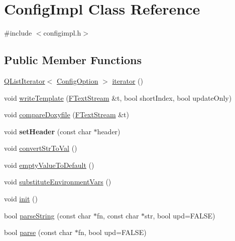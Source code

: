 \hypertarget{class_config_impl}{}\section{Config\+Impl Class Reference}
\label{class_config_impl}


{\ttfamily \#include $<$configimpl.\+h$>$}

\subsection*{Public Member Functions}
\begin{DoxyCompactItemize}
\item 
\mbox{\hyperlink{class_q_list_iterator}{Q\+List\+Iterator}}$<$ \mbox{\hyperlink{class_config_option}{Config\+Option}} $>$ \mbox{\hyperlink{class_config_impl_a71338cf913b7d77ffc139574d7fcfd96}{iterator}} ()
\item 
void \mbox{\hyperlink{class_config_impl_a7c5c68e28946cdb2a25bc9dca561a4c8}{write\+Template}} (\mbox{\hyperlink{class_f_text_stream}{F\+Text\+Stream}} \&t, bool short\+Index, bool update\+Only)
\item 
void \mbox{\hyperlink{class_config_impl_a9e53b42cb637d14b5d072b1e6bb6c9b8}{compare\+Doxyfile}} (\mbox{\hyperlink{class_f_text_stream}{F\+Text\+Stream}} \&t)
\item 
\mbox{\label{class_config_impl_a5a85a09dc81100da9de0dcb148e63c65}} 
void {\bfseries set\+Header} (const char $\ast$header)
\item 
void \mbox{\hyperlink{class_config_impl_a866e373ff4207d492e15ca578e53a551}{convert\+Str\+To\+Val}} ()
\item 
void \mbox{\hyperlink{class_config_impl_ae0072f7a4546b40a6c445e826bb6e027}{empty\+Value\+To\+Default}} ()
\item 
void \mbox{\hyperlink{class_config_impl_a56797aabb7ab52c9bd60f32634e41a5b}{substitute\+Environment\+Vars}} ()
\item 
void \mbox{\hyperlink{class_config_impl_a50654e77279eecd43b0dd91cb21420e5}{init}} ()
\item 
bool \mbox{\hyperlink{class_config_impl_a7aff48f2feae040678f792416a5197a0}{parse\+String}} (const char $\ast$fn, const char $\ast$str, bool upd=F\+A\+L\+SE)
\item 
bool \mbox{\hyperlink{class_config_impl_a61cf9409a0055e7fdfe5e065ee2babd2}{parse}} (const char $\ast$fn, bool upd=F\+A\+L\+SE)
\item 

\end{DoxyCompactItemize}
